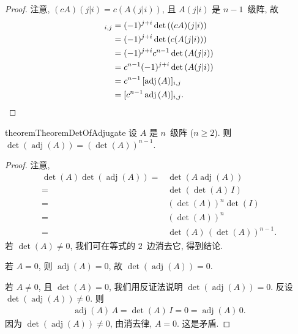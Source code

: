 \documentclass[../libro.tex]{subfiles}
\begin{document}
\begin{proof}
    注意,
    \((cA) (j|i) = c (A (j|i))\),
    且 \(A (j|i)\) 是 \(n-1\)~级阵,
    故
    \begin{align*}
        [\operatorname{adj} {(cA)}]_{i,j}
        = {} &
        (-1)^{j+i} \det {((cA) (j|i))}
        \\
        = {} &
        (-1)^{j+i} \det {(c (A (j|i)))}
        \\
        = {} &
        (-1)^{j+i} c^{n-1} \det {(A (j|i))}
        \\
        = {} &
        c^{n-1} (-1)^{j+i} \det {(A (j|i))}
        \\
        = {} &
        c^{n-1}\, [\operatorname{adj} {(A)}]_{i,j}
        \\
        = {} &
        [c^{n-1} \operatorname{adj} {(A)}]_{i,j}.
        \qedhere
    \end{align*}
\end{proof}

\begin{restatable}{theorem}{TheoremDetOfAdjugate}
    设 \(A\) 是 \(n\)~级阵 (\(n \geq 2\)).
    则
    \(\det {(\operatorname{adj} {(A)})} = (\det {(A)})^{n-1}\).
\end{restatable}

\begin{proof}
    注意,
    \begin{align*}
        \det {(A)} \det {(\operatorname{adj} {(A)})}
        = {} &
        \det {(A \operatorname{adj} {(A)})}
        \\
        = {} &
        \det {(\det {(A)}\, I)}
        \\
        = {} &
        (\det {(A)})^n \det {(I)}
        \\
        = {} &
        (\det {(A)})^n
        \\
        = {} &
        \det {(A)}\, (\det {(A)})^{n-1}.
    \end{align*}
    若 \(\det {(A)} \neq 0\),
    我们可在等式的 \(2\)~边消去它,
    得到结论.

    若 \(A = 0\), 则 \(\operatorname{adj} {(A)} = 0\),
    故 \(\det {(\operatorname{adj} {(A)})} = 0\).

    若 \(A \neq 0\), 且 \(\det {(A)} = 0\),
    我们用反证法说明
    \(\det {(\operatorname{adj} {(A)})} = 0\).
    反设
    \(\det {(\operatorname{adj} {(A)})} \neq 0\).
    则
    \begin{align*}
        \operatorname{adj} {(A)}\, A
        = \det {(A)}\, I
        = 0
        = \operatorname{adj} {(A)}\, 0.
    \end{align*}
    因为
    \(\det {(\operatorname{adj} {(A)})} \neq 0\),
    由消去律, \(A = 0\).
    这是矛盾.
\end{proof}
\end{document}
